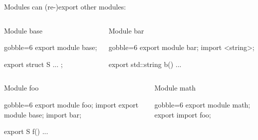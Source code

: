 \begin{frame}[fragile,shrink=5]
  \begin{block}{}
    Modules can (re-)export other modules:
  \end{block}
  \vspace{-5mm}
  \begin{columns}[t]
    \begin{column}{.45\textwidth}
      \begin{exampleblock}{Module base}
        \begin{cppcode*}{gobble=6}
          export module base;

          export struct S { ... };
        \end{cppcode*}
      \end{exampleblock}
    \end{column}
    \begin{column}{.45\textwidth}
      \begin{exampleblock}{Module bar}
        \begin{cppcode*}{gobble=6}
          export module bar;
          import <string>;

          export std::string b()
            { ... }
        \end{cppcode*}
      \end{exampleblock}
    \end{column}
  \end{columns}
  \begin{columns}[t]
    \begin{column}{.45\textwidth}
      \begin{exampleblock}{Module foo}
        \begin{cppcode*}{gobble=6}
          export module foo;
          import export module base;
          import bar;

          export S f() { ... }
        \end{cppcode*}
      \end{exampleblock}
    \end{column}
    \begin{column}{.45\textwidth}
      \begin{exampleblock}{Module math}
        \begin{cppcode*}{gobble=6}
          export module math;
          export import foo;
        \end{cppcode*}
      \end{exampleblock}
    \end{column}
  \end{columns}
\end{frame}

